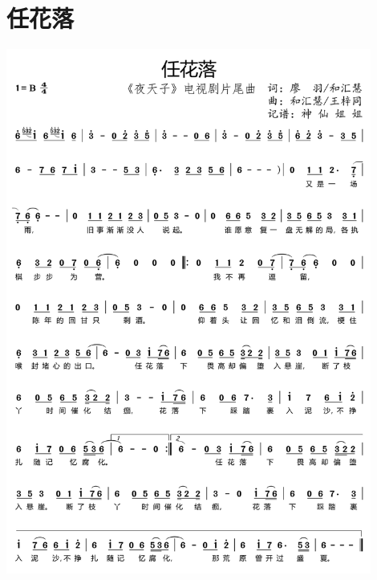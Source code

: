 \documentclass[cn,pad,twocol]{elegantbook}
\begin{document}
\section{任花落} \includegraphics[width=0.9\textwidth]{rpi400/20210206任花落.png}
\end{document}
